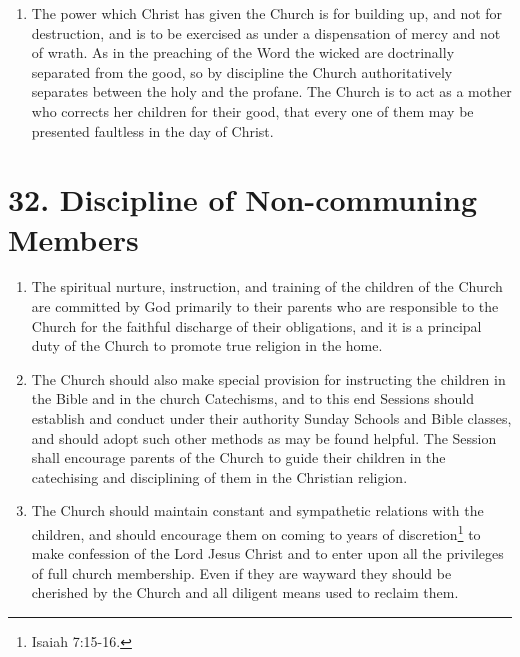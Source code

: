 \documentclass[
]{book}
\providecommand{\tightlist}{%
  \setlength{\itemsep}{0pt}\setlength{\parskip}{0pt}}
\begin{document}
\begin{enumerate}
\def\labelenumi{\arabic{enumi}.}
\setcounter{enumi}{3}
\tightlist
\item
  \protect\hypertarget{31.4}{\href{}{}}The power which Christ has given the Church is for building up, and not for destruction, and is to be exercised as under a dispensation of mercy and not of wrath. As in the preaching of the Word the wicked are doctrinally separated from the good, so by discipline the Church authoritatively separates between the holy and the profane. The Church is to act as a mother who corrects her children for their good, that every one of them may be presented faultless in the day of Christ.
\end{enumerate}

\hypertarget{discipline-of-non-communing-members}{%
\section*{32. Discipline of Non-communing Members}\label{discipline-of-non-communing-members}}

\protect\hypertarget{chapter-slug-32-discipline-of-non-communing-members}{\href{}{}}

\begin{enumerate}
\def\labelenumi{\arabic{enumi}.}
\tightlist
\item
  \protect\hypertarget{32}{\href{}{}}The spiritual nurture, instruction, and training of the children of the Church are committed by God primarily to their parents who are responsible to the Church for the faithful discharge of their obligations, and it is a principal duty of the Church to promote true religion in the home.
\item
  The Church should also make special provision for instructing the children in the Bible and in the church Catechisms, and to this end Sessions should establish and conduct under their authority Sunday Schools and Bible classes, and should adopt such other methods as may be found helpful. The Session shall encourage parents of the Church to guide their children in the catechising and disciplining of them in the Christian religion.
\item
  The Church should maintain constant and sympathetic relations with the children, and should encourage them on coming to years of discretion\footnote{Isaiah 7:15-16.} to make confession of the Lord Jesus Christ and to enter upon all the privileges of full church membership. Even if they are wayward they should be cherished by the Church and all diligent means used to reclaim them.
\end{enumerate}
\end{document}
